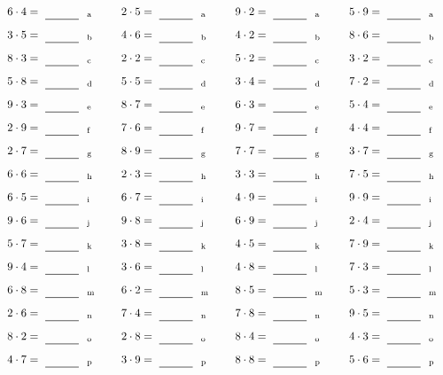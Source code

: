\documentclass
[
  draft    = true,
  fontsize = 11pt,
  parskip  = half-
]
{scrartcl}
\begin{document}
\par\vfill\par
\begin{align*}
    \pline{6\cdot4}&=\rline{a}
  & \pline{2\cdot5}&=\rline{a}
  & \pline{9\cdot2}&=\rline{a}
  & \pline{5\cdot9}&=\rline{a} \\[1ex]
    \pline{3\cdot5}&=\rline{b}
  & \pline{4\cdot6}&=\rline{b}
  & \pline{4\cdot2}&=\rline{b}
  & \pline{8\cdot6}&=\rline{b} \\[1ex]
    \pline{8\cdot3}&=\rline{c}
  & \pline{2\cdot2}&=\rline{c}
  & \pline{5\cdot2}&=\rline{c}
  & \pline{3\cdot2}&=\rline{c} \\[1ex]
    \pline{5\cdot8}&=\rline{d}
  & \pline{5\cdot5}&=\rline{d}
  & \pline{3\cdot4}&=\rline{d}
  & \pline{7\cdot2}&=\rline{d} \\[1ex]
    \pline{9\cdot3}&=\rline{e}
  & \pline{8\cdot7}&=\rline{e}
  & \pline{6\cdot3}&=\rline{e}
  & \pline{5\cdot4}&=\rline{e} \\[1ex]
    \pline{2\cdot9}&=\rline{f}
  & \pline{7\cdot6}&=\rline{f}
  & \pline{9\cdot7}&=\rline{f}
  & \pline{4\cdot4}&=\rline{f} \\[1ex]
    \pline{2\cdot7}&=\rline{g}
  & \pline{8\cdot9}&=\rline{g}
  & \pline{7\cdot7}&=\rline{g}
  & \pline{3\cdot7}&=\rline{g} \\[1ex]
    \pline{6\cdot6}&=\rline{h}
  & \pline{2\cdot3}&=\rline{h}
  & \pline{3\cdot3}&=\rline{h}
  & \pline{7\cdot5}&=\rline{h} \\[1ex]
    \pline{6\cdot5}&=\rline{i}
  & \pline{6\cdot7}&=\rline{i}
  & \pline{4\cdot9}&=\rline{i}
  & \pline{9\cdot9}&=\rline{i} \\[1ex]
    \pline{9\cdot6}&=\rline{j}
  & \pline{9\cdot8}&=\rline{j}
  & \pline{6\cdot9}&=\rline{j}
  & \pline{2\cdot4}&=\rline{j} \\[1ex]
    \pline{5\cdot7}&=\rline{k}
  & \pline{3\cdot8}&=\rline{k}
  & \pline{4\cdot5}&=\rline{k}
  & \pline{7\cdot9}&=\rline{k} \\[1ex]
    \pline{9\cdot4}&=\rline{l}
  & \pline{3\cdot6}&=\rline{l}
  & \pline{4\cdot8}&=\rline{l}
  & \pline{7\cdot3}&=\rline{l} \\[1ex]
    \pline{6\cdot8}&=\rline{m}
  & \pline{6\cdot2}&=\rline{m}
  & \pline{8\cdot5}&=\rline{m}
  & \pline{5\cdot3}&=\rline{m} \\[1ex]
    \pline{2\cdot6}&=\rline{n}
  & \pline{7\cdot4}&=\rline{n}
  & \pline{7\cdot8}&=\rline{n}
  & \pline{9\cdot5}&=\rline{n} \\[1ex]
    \pline{8\cdot2}&=\rline{o}
  & \pline{2\cdot8}&=\rline{o}
  & \pline{8\cdot4}&=\rline{o}
  & \pline{4\cdot3}&=\rline{o} \\[1ex]
    \pline{4\cdot7}&=\rline{p}
  & \pline{3\cdot9}&=\rline{p}
  & \pline{8\cdot8}&=\rline{p}
  & \pline{5\cdot6}&=\rline{p}
\end{align*}
\end{document}
